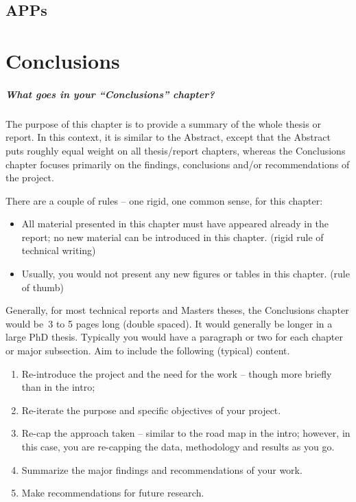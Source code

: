 \documentclass{swfcthesis}
\begin{document}
\section{APPs}
\label{sec:apps}




\chapter{Conclusions}%


\paragraph{What goes in your ``Conclusions'' chapter?}

{ The purpose of this chapter is to provide a summary of the
  whole thesis or report.  In this context, it is similar to the Abstract, except that the
  Abstract puts roughly equal weight on all thesis/report chapters, whereas the
  Conclusions chapter focuses primarily on the findings, conclusions and/or
  recommendations of the project.

  There are a couple of rules – one rigid, one common sense, for this chapter:
  \begin{itemize}
  \item All material presented in this chapter must have appeared already in the report;
    no new material can be introduced in this chapter. (rigid rule of technical writing)
  \item Usually, you would not present any new figures or tables in this chapter. (rule of thumb)
  \end{itemize}

  Generally, for most technical reports and Masters theses, the Conclusions chapter would
  be~3 to 5 pages long (double spaced).  It would generally be longer in a large PhD
  thesis. Typically you would have a paragraph or two for each chapter or major
  subsection.  Aim to include the following (typical) content.
  \begin{enumerate}
  \item Re-introduce the project and the need for the work – though more briefly than in
    the intro;
  \item Re-iterate the purpose and specific objectives of your project.
  \item Re-cap the approach taken – similar to the road map in the intro; however, in this
    case, you are re-capping the data, methodology and results as you go.
  \item Summarize the major findings and recommendations of your work.
  \item Make recommendations for future research.
  \end{enumerate}}
\end{document}
